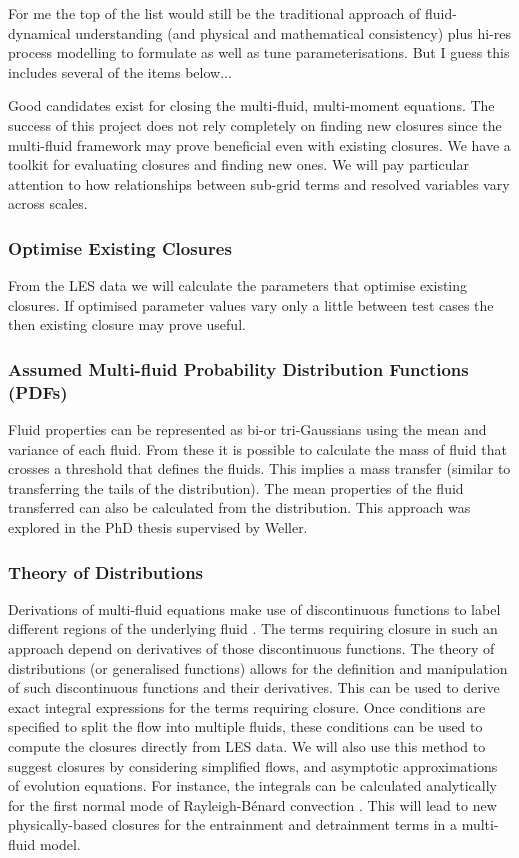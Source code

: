 \documentclass[11pt,a4paper]{article}
\begin{document}
{\color{red} For me the top of the list would still be the traditional approach of fluid-dynamical understanding
(and physical and mathematical consistency) plus hi-res process modelling to formulate as well as tune
parameterisations. But I guess this includes several of the items below...}


Good candidates exist for closing the multi-fluid, multi-moment equations. The success of this project does not rely completely on finding new closures since the multi-fluid framework may prove beneficial even with existing closures. We have a toolkit for evaluating closures and finding new ones. We will pay particular attention to how relationships between sub-grid terms and resolved variables vary across scales. 

\subsubsection*{Optimise Existing Closures}

From the LES data we will calculate the parameters that optimise existing closures. If optimised parameter values vary only a little between test cases the then existing closure may prove useful.

\subsubsection*{Assumed Multi-fluid Probability Distribution Functions (PDFs)}

Fluid properties can be represented as bi-or tri-Gaussians using the mean and variance of each fluid. From these it is possible to calculate the mass of fluid that crosses a threshold that defines the fluids. This implies a mass transfer (similar to transferring the tails of the distribution). The mean properties of the fluid transferred can also be calculated from the distribution. This approach was explored in the PhD thesis \cite{McIn20} supervised by Weller.

\subsubsection*{Theory of Distributions}

Derivations of multi-fluid equations make use of discontinuous functions to label different regions of the underlying fluid \cite[]{Dopa77,TWV+18}. The terms requiring closure in such an approach depend on derivatives of those discontinuous functions. The theory of distributions (or generalised functions) \cite[]{Schw08} allows for the definition and manipulation of such discontinuous functions and their derivatives. This can be used to derive exact integral expressions for the terms requiring closure. Once conditions are specified to split the flow into multiple fluids, these conditions can be used to compute the closures directly from LES data. We will also use this method to suggest closures by considering simplified flows, and asymptotic approximations of evolution equations. For instance, the integrals can be calculated analytically for the first normal mode of Rayleigh-B\'{e}nard convection  \cite[]{SWCM2x}. This will lead to new physically-based closures for the entrainment and detrainment terms in a multi-fluid model. 
\end{document}
